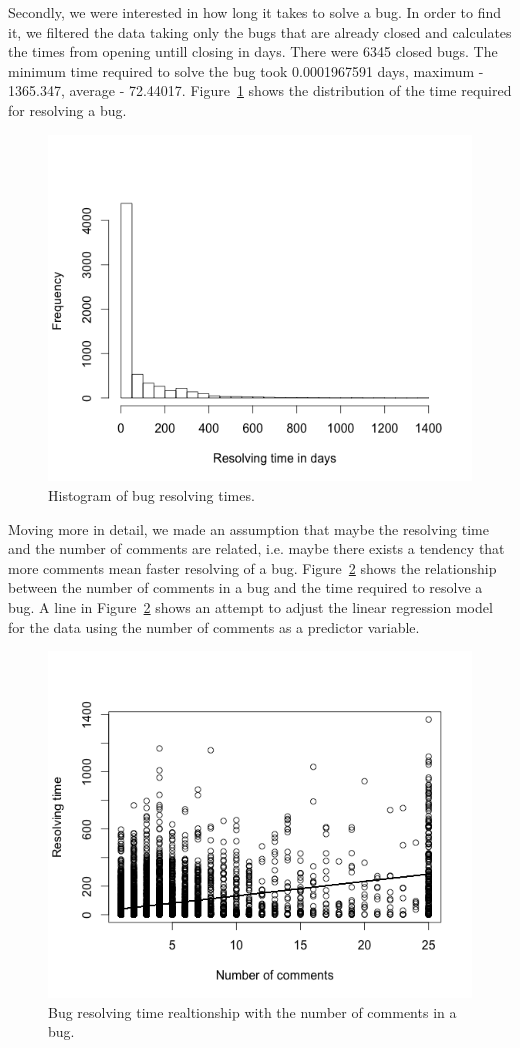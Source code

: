 \documentclass[a4paper,11pt]{article}
\begin{document}
Secondly, we were interested in how long it takes to solve a bug. In order to find it, we filtered the data taking only the bugs that are already closed and calculates the times from opening untill closing in days. There were 6345 closed bugs. The minimum time required to solve the bug took 0.0001967591 days, maximum - 1365.347, average - 72.44017. Figure~\ref{fig:res_times} shows the distribution of the time required for resolving a bug.

\begin{figure}[ht!]
\centering
\includegraphics[width=.7\textwidth]{../diagrams/resolving_times.png}
\caption{Histogram of bug resolving times.}
\label{fig:res_times}
\end{figure}
 
Moving more in detail, we made an assumption that maybe the resolving time and the number of comments are related, i.e. maybe there exists a tendency that more comments mean faster resolving of a bug. Figure~\ref{fig:com_time} shows the relationship between the number of comments in a bug and the time required to resolve a bug. A line in Figure~\ref{fig:com_time} shows an attempt to adjust the linear regression model for the data using the number of comments as a predictor variable.

\begin{figure}[ht!]
\centering
\includegraphics[width=.7\textwidth]{../diagrams/comments_time.png}
\caption{Bug resolving time realtionship with the number of comments in a bug.}
\label{fig:com_time}
\end{figure}
\end{document}
